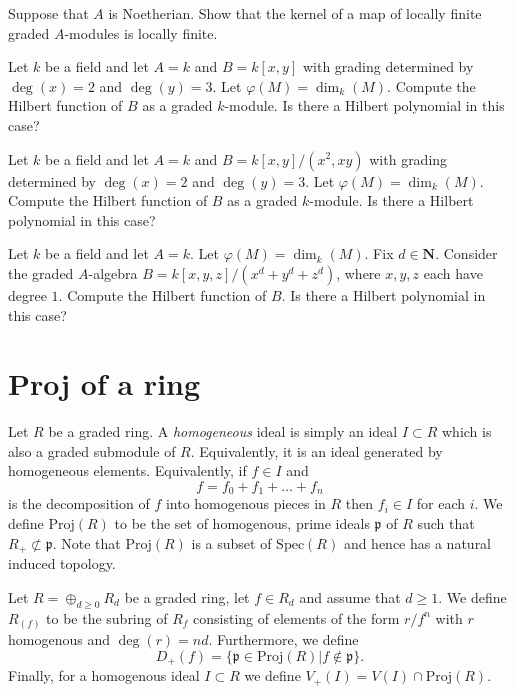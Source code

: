 \begin{exercise}
Suppose that $A$ is Noetherian. Show that the kernel of a map
of locally finite graded $A$-modules is locally finite.
\end{exercise}

\begin{exercise}
Let $k$ be a field and let $A=k$ and $B=k[x,y]$ with grading
determined by $\deg(x)=2$ and $\deg(y)=3$. Let $\varphi(M)=\dim_k(M)$.
Compute the Hilbert function of $B$ as a graded $k$-module. Is there
a Hilbert polynomial in this case?
\end{exercise}

\begin{exercise}
Let $k$ be a field and let $A=k$ and $B=k[x,y]/(x^2,xy)$ with grading
determined by $\deg(x)=2$ and $\deg(y)=3$. Let $\varphi(M)=\dim_k(M)$.
Compute the Hilbert function of $B$ as a graded $k$-module. Is there
a Hilbert polynomial in this case?
\end{exercise}

\begin{exercise}
Let $k$ be a field and let $A=k$.  Let $\varphi(M)=\dim_k(M)$.
Fix $d\in {\mathbf N}$. Consider the graded $A$-algebra
$B=k[x,y,z]/(x^d+y^d+z^d)$, where  $x,y,z$ each have degree $1$.
Compute the Hilbert function of $B$. Is there a Hilbert polynomial
in this case?
\end{exercise}



\section{Proj of a ring}
\label{section-proj-ring}

\begin{definition}
Let $R$ be a graded ring. A {\it homogeneous} ideal is simply an ideal
$I \subset R$ which is also a graded submodule of $R$. Equivalently, 
it is an ideal generated by homogeneous elements. Equivalently, if
$f \in I$ and 
$$
f = f_0 + f_1 + \ldots + f_n
$$
is the decomposition of $f$ into homogenous pieces in $R$ then $f_i \in I$
for each $i$. We define $\text{Proj}(R)$ to be the set of homogenous, prime ideals
${\mathfrak p}$ of $R$ such that $R_{+} \not \subset {\mathfrak p}$.
Note that $\text{Proj}(R)$ is a subset of $\text{Spec}(R)$ and hence has a
natural induced topology.
\end{definition}

\begin{definition}
Let $R = \oplus_{d \geq 0} R_d$ be a graded ring, let $f\in R_d$ and
assume that $d \geq 1$. We define $R_{(f)}$ to be the subring of
$R_f$ consisting of elements of the form $r/f^n$ with $r$ homogenous and
$\deg(r) = nd$. Furthermore, we define
$$
D_{+}(f) = \{ {\mathfrak p} \in \text{Proj}(R) | f \not\in {\mathfrak p} \}.
$$
Finally, for a homogenous ideal $I \subset R$ we define 
$V_{+}(I) = V(I) \cap \text{Proj}(R)$.
\end{definition}

